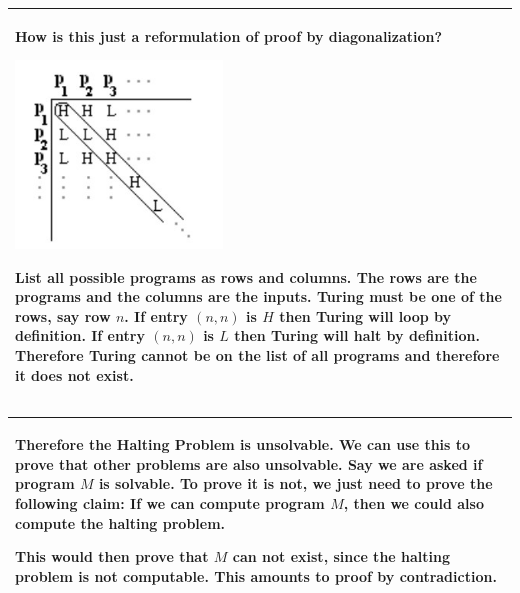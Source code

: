 {\begin{tabu}{|p{16cm} |}
How is this just a reformulation of proof by diagonalization?
\begin{center}
\includegraphics[width=5.5cm, height=5cm]{intro_diagonal.jpg}
\end{center}
\begin{solution}[1.3 in]
List all possible programs as rows and columns. The rows are the programs 
and the columns are the inputs. Turing must be one of the rows, say row $n$. 
If entry $(n, n) $ is $H$ then Turing will loop by definition. If entry 
$(n, n)$ is $L$ then Turing will halt by definition. Therefore Turing 
cannot be on the list of all programs and therefore it does not exist. 
\end{solution}
\\
\hline
\end{tabu}
}

{\tabulinesep=1mm
\begin{tabu}{|p{16cm} |}
\hline
Therefore the Halting Problem is unsolvable. We can use this to prove 
that other problems are also unsolvable. Say we are asked if program $M$
is solvable. To prove it is not, we just need to prove the following claim: 
If we can compute program $M$, then we could also compute the halting problem.

This would then prove that $M$ can not exist, since the halting problem 
is not computable. This amounts to proof by contradiction.
\\
\hline
\end{tabu}
}